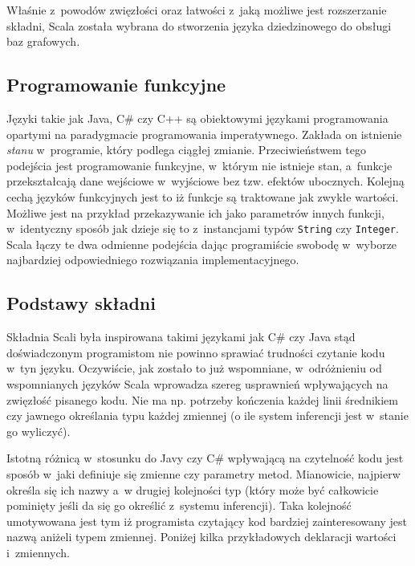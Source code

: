 \documentclass{xmgr}
\begin{document}
Właśnie z~powodów zwięzłości oraz łatwości z~jaką możliwe jest rozszerzanie składni, Scala została wybrana do stworzenia języka dziedzinowego do obsługi baz grafowych.

\subsection{Programowanie funkcyjne}

Języki takie jak Java, C\# czy C++ są obiektowymi językami programowania opartymi na paradygmacie programowania imperatywnego. Zakłada on istnienie \textit{stanu} w~programie, który podlega ciągłej zmianie. Przeciwieństwem tego podejścia jest programowanie funkcyjne, w~którym nie istnieje stan, a~funkcje przekształcają dane wejściowe w~wyjściowe bez tzw. efektów ubocznych. Kolejną cechą języków funkcyjnych jest to iż funkcje są traktowane jak zwykłe wartości. Możliwe jest na przykład przekazywanie ich jako parametrów innych funkcji, w~identyczny sposób jak dzieje się to z~instancjami typów \texttt{String} czy \texttt{Integer}. Scala łączy te dwa odmienne podejścia dając programiście swobodę w~wyborze najbardziej odpowiedniego rozwiązania implementacyjnego.

\subsection{Podstawy składni}
Składnia Scali była inspirowana takimi językami jak C\# czy Java stąd doświadczonym programistom nie powinno sprawiać trudności czytanie kodu w~tyn języku. Oczywiście, jak zostało to już wspomniane, w~odróżnieniu od wspomnianych języków Scala wprowadza szereg usprawnień wpływających na zwięzłość pisanego kodu. Nie ma np. potrzeby kończenia każdej linii średnikiem czy jawnego określania typu każdej zmiennej (o ile system inferencji jest w~stanie go wyliczyć).

Istotną różnicą w~stosunku do Javy czy C\# wpływającą na czytelność kodu jest sposób w~jaki definiuje się zmienne czy parametry metod. Mianowicie, najpierw określa się ich nazwy a~w drugiej kolejności typ (który może być całkowicie pominięty jeśli da się go określić z~systemu inferencji). Taka kolejność umotywowana jest tym iż programista czytający kod bardziej zainteresowany jest nazwą aniżeli typem zmiennej. Poniżej kilka przykładowych deklaracji wartości i~zmiennych.

\newpage

\inputminted{scala}{listings/scala/val-var-declarations.scala}
\end{document}

